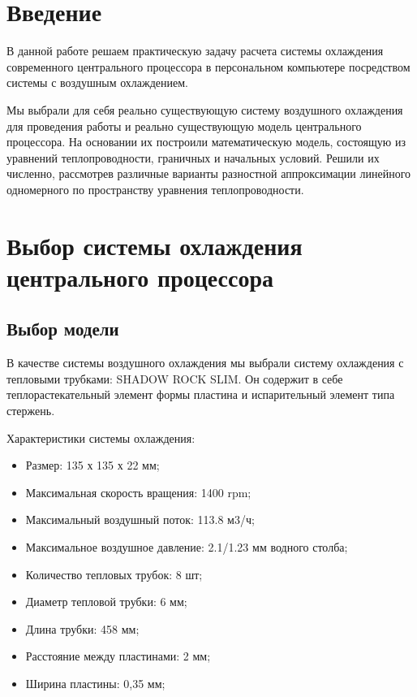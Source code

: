 \documentclass[a4paper]{article}
\begin{document}
\section{Введение}

В данной работе решаем практическую задачу расчета системы охлаждения современного центрального процессора в персональном компьютере посредством системы с воздушным охлаждением.

Мы выбрали для себя реально существующую систему воздушного охлаждения для проведения работы и реально существующую модель центрального процессора. На основании их построили математическую модель, состоящую из уравнений теплопроводности, граничных и начальных условий. Решили их численно, рассмотрев различные варианты разностной аппроксимации линейного одномерного по пространству уравнения теплопроводности.

\newpage
\section{Выбор системы охлаждения центрального процессора}

\subsection{Выбор модели}

В качестве системы воздушного охлаждения мы выбрали систему охлаждения с тепловыми трубками: SHADOW ROCK SLIM. Он содержит в себе теплорастекательный элемент формы пластина и испарительный элемент типа стержень. 

Характеристики системы охлаждения:

\begin{itemize}
    \item Размер: 135 х 135 х 22 мм;
    \item Максимальная скорость вращения: 1400 rpm;
    \item Максимальный воздушный поток: 113.8 м3/ч;
    \item Максимальное воздушное давление: 2.1/1.23 мм водного столба;
    \item Количество тепловых трубок: 8 шт;
    \item Диаметр тепловой трубки: 6 мм;
    \item Длина трубки: 458 мм;
    \item Расстояние между пластинами: 2 мм;
    \item Ширина пластины: 0,35 мм;
\end{itemize}
\end{document}
